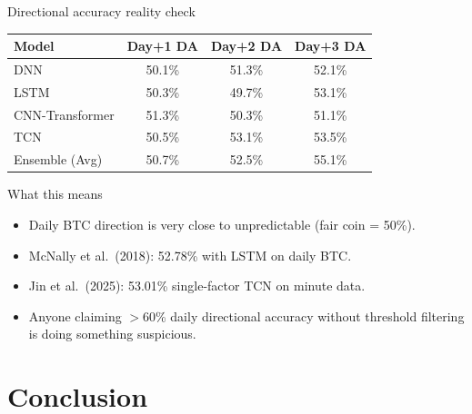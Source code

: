 \documentclass[aspectratio=169]{beamer}
\begin{document}
\begin{frame}{Directional accuracy reality check}
\begin{center}
\footnotesize
\begin{tabular}{lccc}
\toprule
\textbf{Model} & \textbf{Day+1 DA} & \textbf{Day+2 DA} & \textbf{Day+3 DA} \\
\midrule
DNN & 50.1\% & 51.3\% & 52.1\% \\
LSTM & 50.3\% & 49.7\% & 53.1\% \\
CNN-Transformer & 51.3\% & 50.3\% & 51.1\% \\
TCN & 50.5\% & 53.1\% & 53.5\% \\
Ensemble (Avg) & 50.7\% & 52.5\% & 55.1\% \\
\bottomrule
\end{tabular}
\end{center}

\vspace{0.3cm}
\begin{block}{What this means}
\begin{itemize}\small
  \item Daily BTC direction is very close to unpredictable (fair coin = 50\%).
  \item McNally et al.\ (2018): 52.78\% with LSTM on daily BTC.
  \item Jin et al.\ (2025): 53.01\% single-factor TCN on minute data.
  \item Anyone claiming $>$60\% daily directional accuracy without threshold filtering is doing something suspicious.
\end{itemize}
\end{block}
\end{frame}


\section{Conclusion}
\end{document}
